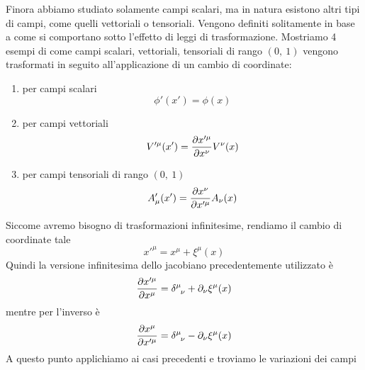     Finora abbiamo studiato solamente campi scalari, ma in natura esistono altri tipi di campi, come quelli vettoriali o tensoriali. Vengono definiti solitamente in base a come si comportano sotto l'effetto di leggi di trasformazione. Mostriamo 4 esempi di come campi scalari, vettoriali, tensoriali di rango $(0,~1)$ vengono trasformati in seguito all'applicazione di un cambio di coordinate:
\begin{enumerate}
    \item per campi scalari
\begin{equation}
    \phi'(x') = \phi(x)
\end{equation}
    \item per campi vettoriali
\begin{equation}
    V'^\mu(x') = \frac{\partial x'^\mu}{\partial x^\nu} V^\nu(x)
\end{equation}
    \item per campi tensoriali di rango $(0,~1)$
\begin{equation}
    A'_\mu(x') = \frac{\partial x^\nu}{\partial x'^\mu} A_\nu(x)
\end{equation}
\end{enumerate} 
    Siccome avremo bisogno di trasformazioni infinitesime, rendiamo il cambio di coordinate tale 
\begin{equation}
    x'^\mu = x^\mu + \xi^\mu(x)
\end{equation}
    Quindi la versione infinitesima dello jacobiano precedentemente utilizzato è 
\begin{equation}
    \pdv{x'^\mu}{x^\mu} = \delta^{\mu}_{\phantom \mu \nu} + \partial_\nu \xi^\mu(x)
\end{equation}
    mentre per l'inverso è 
\begin{equation}
    \pdv{x^\mu}{x'^\mu} = \delta^{\mu}_{\phantom \mu \nu} - \partial_\nu \xi^\mu(x)
\end{equation}
    A questo punto applichiamo ai casi precedenti e troviamo le variazioni dei campi
